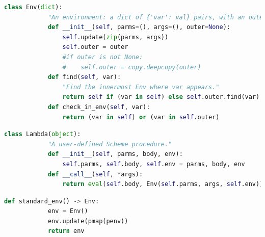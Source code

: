 \documentclass[12pt]{article}%
\theoremstyle{definition}
\begin{document}
	
		\begin{lstlisting}[language=Python]
		class Env(dict):
		    "An environment: a dict of {'var': val} pairs, with an outer Env."
		    def __init__(self, parms=(), args=(), outer=None):
		        self.update(zip(parms, args))
		        self.outer = outer
		        #if outer is not None:
		        #    self.outer = copy.deepcopy(outer)
		    def find(self, var):
		        "Find the innermost Env where var appears."
		        return self if (var in self) else self.outer.find(var)
		    def check_in_env(self, var):
		        return (var in self) or (var in self.outer)
		\end{lstlisting}
		
		
		
		\begin{lstlisting}[language=Python]
		class Lambda(object):
		    "A user-defined Scheme procedure."
		    def __init__(self, parms, body, env):
		        self.parms, self.body, self.env = parms, body, env
		    def __call__(self, *args):
		        return eval(self.body, Env(self.parms, args, self.env)) 
		\end{lstlisting}
			
		
		
		\begin{lstlisting}[language=Python]
		def standard_env() -> Env:
		    env = Env()
		    env.update(pmap(penv))
		    return env
		\end{lstlisting}
		
		
		
		
			
\end{document}
